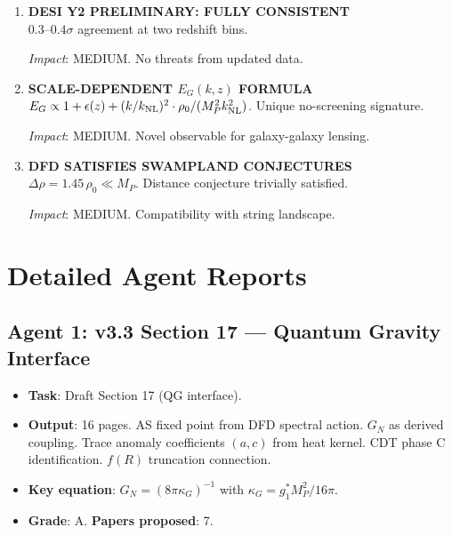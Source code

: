 \documentclass[11pt,a4paper]{article}
\begin{document}
\begin{enumerate}[label=\textbf{\arabic*.}, leftmargin=1.5cm]
\textit{Impact}: MEDIUM-HIGH. First quantitative QG lattice connection.

\item \textbf{DESI Y2 PRELIMINARY: FULLY CONSISTENT}\\
$0.3$--$0.4\sigma$ agreement at two redshift bins.

\textit{Impact}: MEDIUM. No threats from updated data.

\item \textbf{SCALE-DEPENDENT $E_G(k,z)$ FORMULA}\\
$E_G \propto 1 + \epsilon(z) + (k/k_{\rm NL})^2 \cdot \rho_0/(M_P^2 k_{\rm NL}^2)$. Unique no-screening signature.

\textit{Impact}: MEDIUM. Novel observable for galaxy-galaxy lensing.

\item \textbf{DFD SATISFIES SWAMPLAND CONJECTURES}\\
$\Delta\rho = 1.45\,\rho_0 \ll M_P$. Distance conjecture trivially satisfied.

\textit{Impact}: MEDIUM. Compatibility with string landscape.

\end{enumerate}

\section{Detailed Agent Reports}

\subsection{Agent 1: v3.3 Section 17 --- Quantum Gravity Interface}
\begin{itemize}[nosep]
\item \textbf{Task}: Draft Section 17 (QG interface).
\item \textbf{Output}: 16 pages. AS fixed point from DFD spectral action. $G_N$ as derived coupling. Trace anomaly coefficients $(a,c)$ from heat kernel. CDT phase C identification. $f(R)$ truncation connection.
\item \textbf{Key equation}: $G_N = (8\pi\kappa_G)^{-1}$ with $\kappa_G = g_1^* M_P^2/16\pi$.
\item \textbf{Grade}: A. \textbf{Papers proposed}: 7.
\end{itemize}
\end{document}
